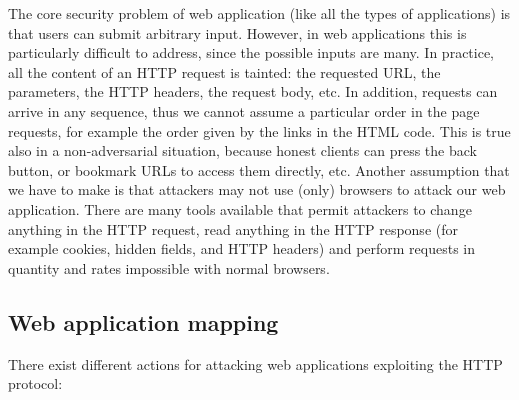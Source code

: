 \documentclass[a4paper,12pt]{article}
\begin{document}
The core security problem of web application (like all the types of applications) is that users can submit arbitrary input. However, in web applications this is particularly difficult to address, since the possible inputs are many. In practice, all the content of an HTTP request is tainted: the requested URL, the parameters, the HTTP headers, the request body, etc. In addition, requests can arrive in any sequence, thus we cannot assume a particular order in the page requests, for example the order given by the links in the HTML code. This is true also in a non-adversarial situation, because honest clients can press the back button, or bookmark URLs to access them directly, etc. Another assumption that we have to make is that attackers may not use (only) browsers to attack our web application. There are many tools available that permit attackers to change anything in the HTTP request, read anything in the HTTP response (for example cookies, hidden fields, and HTTP headers) and perform requests in quantity and rates impossible with normal browsers.

\subsection{Web application mapping}
There exist different actions for attacking web applications exploiting the HTTP protocol:
\end{document}
